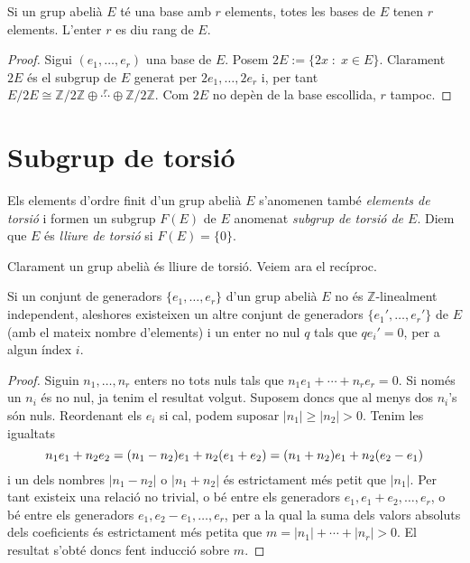 \documentclass[../main.tex]{subfiles}
\begin{document}
\begin{prop}
Si un grup abelià $E$ té una base amb $r$ elements, totes les bases de $E$ tenen $r$ elements. L'enter $r$ es diu rang de $E$.
\end{prop}
\begin{proof}
Sigui $(e_1,\ldots,e_r)$ una base de $E$. Posem $2E:=\{2x\;:\;x\in E\}$. Clarament $2E$ és el subgrup de $E$ generat per $2e_1,\ldots,2e_r$ i, per tant $E/2E\cong \mathbb{Z}/2\mathbb{Z}\oplus\overset{r}{\cdots}\oplus\mathbb{Z}/2\mathbb{Z}$. Com $2E$ no depèn de la base escollida, $r$ tampoc.
\end{proof}








\section{Subgrup de torsió}
\begin{defi}
Els elements d'ordre finit d'un grup abelià $E$ s'anomenen també \textit{elements de torsió} i formen un subgrup $F(E)$ de $E$ anomenat \textit{subgrup de torsió de $E$}. Diem que $E$ és \textit{lliure de torsió} si $F(E) = \{0\}$.
\end{defi}

Clarament un grup abelià és lliure de torsió. Veiem ara el recíproc.

\begin{lema}
Si un conjunt de generadors $\{e_1,\ldots,e_r\}$ d'un grup abelià $E$ no és $\mathbb{Z}$-linealment independent, aleshores existeixen un altre conjunt de generadors $\{e_1',\ldots,e_r'\}$ de $E$ (amb el mateix nombre d'elements) i un enter no nul $q$ tals que $qe_i' = 0$, per a algun índex $i$.
\end{lema}
\begin{proof}
Siguin $n_1,\ldots,n_r$ enters no tots nuls tals que $n_1e_1+\cdots+n_re_r = 0$. Si només un $n_i$ és no nul, ja tenim el resultat volgut. Suposem doncs que al menys dos $n_i$'s són nuls. Reordenant els $e_i$ si cal, podem suposar $|n_1|\geq |n_2|>0$. Tenim les igualtats
\begin{equation}
    \notag
    n_1e_1+n_2e_2 = (n_1-n_2)e_1+n_2(e_1+e_2) = (n_1+n_2)e_1+n_2(e_2-e_1)
\end{equation}
i un dels nombres $|n_1-n_2|$ o $|n_1+n_2|$ és estrictament més petit que $|n_1|$. Per tant existeix una relació no trivial, o bé entre els generadors $e_1,e_1+e_2,\ldots,e_r$, o bé entre els generadors $e_1,e_2-e_1,\ldots,e_r$, per a la qual la suma dels valors absoluts dels coeficients és estrictament més petita que $m = |n_1|+\cdots+|n_r|>0$. El resultat s'obté doncs fent inducció sobre $m$.
\end{proof}
\end{document}

